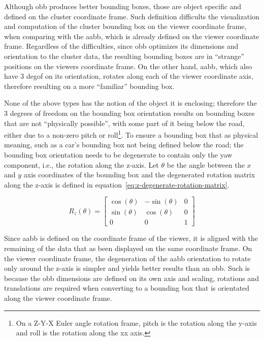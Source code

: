 Although \ac{obb} produces better bounding boxes, those are object specific and defined on the cluster coordinate frame. Such definition difficults the visualization and computation of the cluster bounding box on the viewer coordinate frame, when comparing with the \ac{aabb}, which is already defined on the viewer coordinate frame. Regardless of the difficulties, since \ac{obb} optimizes its dimensions and orientation to the cluster data, the resulting bounding boxes are in ``strange'' positions on the viewers coordinate frame. On the other hand, \ac{aabb}, which also have 3 \ac{degof} on its orientation, rotates along each of the viewer coordinate axis, therefore resulting on a more ``familiar'' bounding box.

None of the above types has the notion of the object it is enclosing; therefore the 3 degrees of freedom  on the bounding box orientation results on bounding boxes that are not ``physically possible'', with some part of it being below the road, either due to a non-zero pitch or roll\footnote{On a Z-Y-X Euler angle rotation frame, pitch is the rotation along the y-axis and roll is the rotation along the xx axis.}. To ensure a bounding box that as physical meaning, such as a car's bounding box not being defined below the road; the bounding box orientation needs to be degenerate to contain only the yaw component, i.e., the rotation along the z-axis. Let $\theta$ be the angle between the $x$ and $y$ axis coordinates of the bounding box and the degenerated rotation matrix along the z-axis is defined in equation~\eqref{eq:z-degenerate-rotation-matrix}.

\begin{equation}
	\label{eq:z-degenerate-rotation-matrix}
	R_z(\theta) = 
	\begin{bmatrix}
		\cos(\theta) & -\sin(\theta) & 0 \\
		\sin(\theta) & \cos(\theta) & 0 \\
		0 & 0 & 1
	\end{bmatrix}
\end{equation}

Since \ac{aabb} is defined on the coordinate frame of the viewer, it is aligned with the remaining of the data that as been displayed on the same coordinate frame. On the viewer coordinate frame, the degeneration of the \ac{aabb} orientation to rotate only around the z-axis is simpler and yields better results than an \ac{obb}. Such is because the \ac{obb} dimensions are defined on its own axis and scaling, rotations and translations are required when converting to a bounding box that is orientated along the viewer coordinate frame. 

